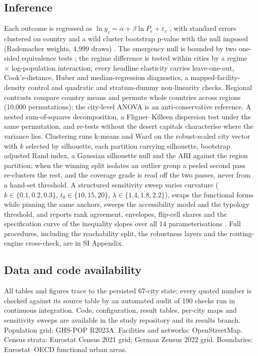 \documentclass[9pt,twocolumn]{article}
\begin{document}
\subsection*{Inference}
Each outcome is regressed as $\ln y_c = \alpha + \beta \ln P_c +
\varepsilon_c$ \citep{bettencourt2007growth}, with standard errors
clustered on country and a wild cluster bootstrap p-value with the null
imposed (Rademacher weights, 4{,}999 draws)
\citep{cameron2008bootstrap,mackinnon2023cluster}. The emergency null is
bounded by two one-sided equivalence tests \citep{lakens2017equivalence};
the regime difference is tested within cities by a regime $\times$
log-population interaction; every headline elasticity carries
leave-one-out, Cook's-distance, Huber and median-regression diagnostics, a
mapped-facility-density control and quadratic and stratum-dummy
non-linearity checks. Regional contrasts compare country means and
permute whole countries across regions (10{,}000 permutations); the
city-level ANOVA is an anti-conservative reference. A nested
sum-of-squares decomposition, a Fligner--Killeen dispersion test under the
same permutation, and re-tests without the desert capitals characterise
where the variance lies. Clustering runs k-means and Ward on the
robust-scaled city vector with $k$ selected by silhouette, each partition
carrying silhouette, bootstrap adjusted Rand index, a Gaussian silhouette
null and the ARI against the region partition; when the winning split
isolates an outlier group a peeled second pass re-clusters the rest, and
the coverage grade is read off the two passes, never from a hand-set
threshold. A structured sensitivity sweep varies curvature
($k \in \{0.1,0.2,0.3\}$, $t_0 \in \{10,15,20\}$, $\lambda \in
\{1.4,1.8,2.2\}$), swaps the functional forms while pinning the same
anchors, sweeps the accessibility model and the typology threshold, and
reports rank agreement, envelopes, flip-cell shares and the
specification curve of the inequality slopes over all 14
parameterisations \citep{simonsohn2020specification}. Full procedures,
including the reachability split, the robustness layers and the
routing-engine cross-check, are in SI Appendix.

\subsection*{Data and code availability}
All tables and figures trace to the persisted 67-city state; every quoted
number is checked against its source table by an automated audit of 190
checks run in continuous integration. Code, configuration, result tables,
per-city maps and sensitivity sweeps are available in the study
repository and its results branch. Population grid: GHS-POP R2023A.
Facilities and networks: OpenStreetMap. Census strata: Eurostat Census
2021 grid; German Zensus 2022 grid. Boundaries: Eurostat--OECD functional
urban areas.



\end{document}
